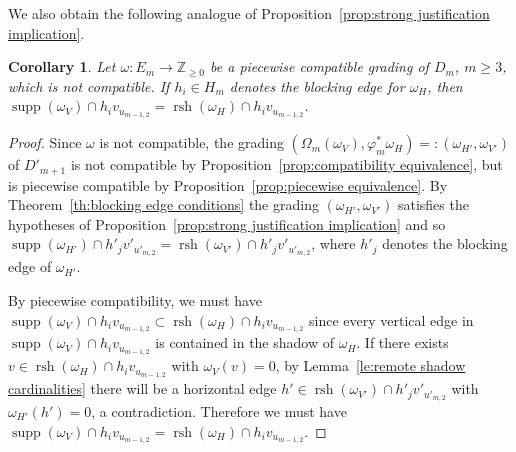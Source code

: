 \documentclass[10pt]{amsart}
\newtheorem{corollary}[theorem]{Corollary}
\theoremstyle{definition}
\newcommand{\ZZ}{\mathbb{Z}}
\DeclareMathOperator{\supp}{supp}
\DeclareMathOperator{\rsh}{rsh}
\begin{document}
We also obtain the following analogue of Proposition~\ref{prop:strong justification implication}.
\begin{corollary}
 \label{cor:support and remote shadow}
 Let $\omega:E_m\to\ZZ_{\ge0}$ be a piecewise compatible grading of $D_m$, $m\ge3$, which is not compatible.
 If $h_i\in H_m$ denotes the blocking edge for $\omega_H$, then $\supp(\omega_V)\cap h_iv_{u_{m-1,2}}=\rsh(\omega_H)\cap h_iv_{u_{m-1,2}}$.
\end{corollary}
\begin{proof}
 Since $\omega$ is not compatible, the grading $(\Omega_m(\omega_V),\varphi^*_m\omega_H)=:(\omega_{H'},\omega_{V'})$ of $D'_{m+1}$ is not compatible by Proposition~\ref{prop:compatibility equivalence}, but is piecewise compatible by Proposition~\ref{prop:piecewise equivalence}.
 By Theorem~\ref{th:blocking edge conditions} the grading $(\omega_{H'},\omega_{V'})$ satisfies the hypotheses of Proposition~\ref{prop:strong justification implication} and so $\supp(\omega_{H'})\cap h'_jv'_{u'_{m,2}}=\rsh(\omega_{V'})\cap h'_jv'_{u'_{m,2}}$, where $h'_j$ denotes the blocking edge of $\omega_{H'}$.

 By piecewise compatibility, we must have $\supp(\omega_V)\cap h_iv_{u_{m-1,2}}\subset\rsh(\omega_H)\cap h_iv_{u_{m-1,2}}$ since every vertical edge in $\supp(\omega_V)\cap h_iv_{u_{m-1,2}}$ is contained in the shadow of $\omega_H$.
 If there exists $v\in\rsh(\omega_H)\cap h_iv_{u_{m-1,2}}$ with $\omega_V(v)=0$, by Lemma~\ref{le:remote shadow cardinalities} there will be a horizontal edge $h'\in\rsh(\omega_{V'})\cap h'_jv'_{u'_{m,2}}$ with $\omega_{H'}(h')=0$, a contradiction.
 Therefore we must have $\supp(\omega_V)\cap h_iv_{u_{m-1,2}}=\rsh(\omega_H)\cap h_iv_{u_{m-1,2}}$.
\end{proof}
\end{document}
